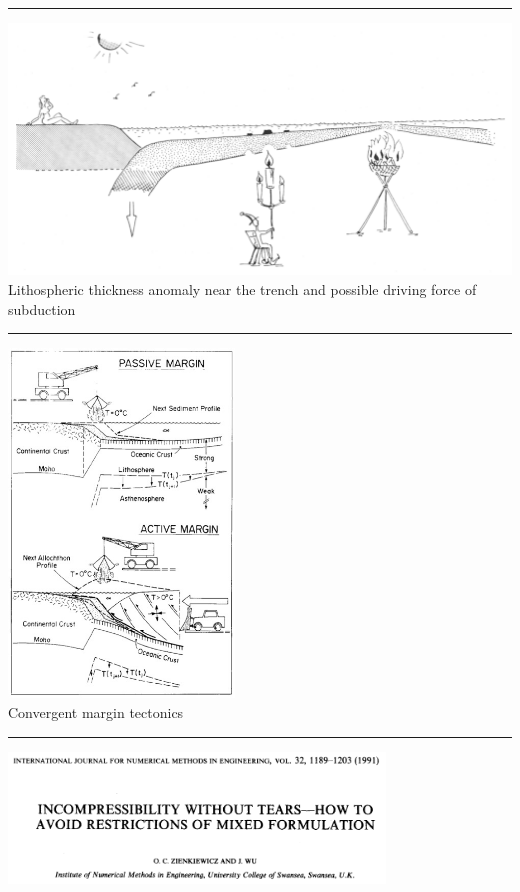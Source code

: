 \par\noindent\rule{\textwidth}{0.4pt}

\begin{center}
\includegraphics[width=14cm]{images/interesting/futo85}\\
{\tiny Lithospheric thickness anomaly near the trench and possible driving force of subduction \cite{futo85}}
\end{center}

\par\noindent\rule{\textwidth}{0.4pt}

\begin{center}
\includegraphics[width=6cm]{images/interesting/stbb86}\\
{\tiny Convergent margin tectonics \cite{stbb86}}
\end{center}


\par\noindent\rule{\textwidth}{0.4pt}
\begin{center}
\includegraphics[width=10cm]{images/interesting/ziwu91} {\tiny \cite{ziwu91}}
\end{center}


